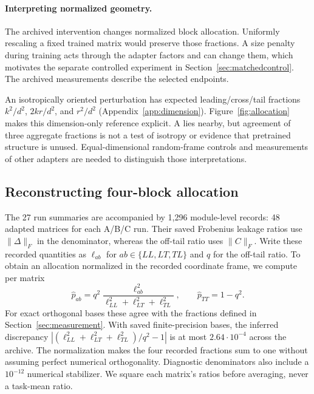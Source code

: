 \documentclass{article}
\begin{document}
\paragraph{Interpreting normalized geometry.}
The archived intervention changes normalized block allocation. Uniformly rescaling a fixed trained matrix would preserve those fractions. A size penalty during training acts through the adapter factors and can change them, which motivates the separate controlled experiment in Section~\ref{sec:matchedcontrol}. The archived measurements describe the selected endpoints.

An isotropically oriented perturbation has expected leading/cross/tail fractions $k^2/d^2$, $2kr/d^2$, and $r^2/d^2$ (Appendix~\ref{app:dimension}). Figure~\ref{fig:allocation} makes this dimension-only reference explicit. A lies nearby, but agreement of three aggregate fractions is not a test of isotropy or evidence that pretrained structure is unused. Equal-dimensional random-frame controls and measurements of other adapters are needed to distinguish those interpretations.

\subsection{Reconstructing four-block allocation}
\label{app:blockallocation}
The 27 run summaries are accompanied by 1,296 module-level records: 48 adapted matrices for each A/B/C run. Their saved Frobenius leakage ratios use $\|\Delta\|_F$ in the denominator, whereas the off-tail ratio uses $\|C\|_F$. Write these recorded quantities as $\ell_{ab}$ for $ab\in\{LL,LT,TL\}$ and $q$ for the off-tail ratio. To obtain an allocation normalized in the recorded coordinate frame, we compute per matrix
\begin{equation}
\widehat p_{ab}=q^2\frac{\ell_{ab}^2}{\ell_{LL}^2+\ell_{LT}^2+\ell_{TL}^2},\qquad
\widehat p_{TT}=1-q^2.
\label{eq:recordedallocation}
\end{equation}
For exact orthogonal bases these agree with the fractions defined in Section~\ref{sec:measurement}. With saved finite-precision bases, the inferred discrepancy $\left|(\ell_{LL}^2+\ell_{LT}^2+\ell_{TL}^2)/q^2-1\right|$ is at most $2.64\cdot10^{-4}$ across the archive. The normalization makes the four recorded fractions sum to one without assuming perfect numerical orthogonality. Diagnostic denominators also include a $10^{-12}$ numerical stabilizer. We square each matrix's ratios before averaging, never a task-mean ratio.
\end{document}
